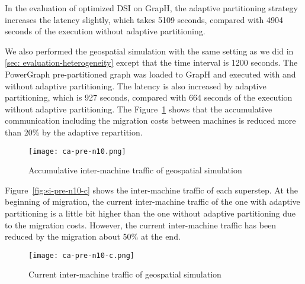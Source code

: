 In the evaluation of optimized DSI on GrapH, the adaptive partitioning strategy increases the latency slightly, which takes 5109 seconds, compared with 4904 seconds of the execution without adaptive partitioning.

We also performed the geospatial simulation with the same setting as we did in \ref{sec: evaluation-heterogeneity} except that the time interval is 1200 seconds. The PowerGraph pre-partitioned graph was loaded to GrapH and executed with and without adaptive partitioning. The latency is also increased by adaptive partitioning, which is 927 seconds, compared with 664 seconds of the execution without adaptive partitioning. The Figure~\ref{fig:ca-pre-n10} shows that the accumulative communication including the migration costs between machines is reduced more than 20\% by the adaptive repartition.

\begin{figure}[H]
  \begin{center}
    \texttt{[image: ca-pre-n10.png]}
    \caption{Accumulative inter-machine traffic of geospatial simulation}
    \label{fig:ca-pre-n10}
  \end{center}
\end{figure}

Figure~\ref{fig:si-pre-n10-c} shows the inter-machine traffic of each superstep. At the beginning of migration, the current inter-machine traffic of the one with adaptive partitioning is a little bit higher than the one without adaptive partitioning due to the migration costs. However, the current inter-machine traffic has been reduced by the migration about 50\% at the end.

\begin{figure}[H]
  \begin{center}
    \texttt{[image: ca-pre-n10-c.png]}
    \caption{Current inter-machine traffic of geospatial simulation}
    \label{fig:ca-pre-n10-c}
  \end{center}
\end{figure}